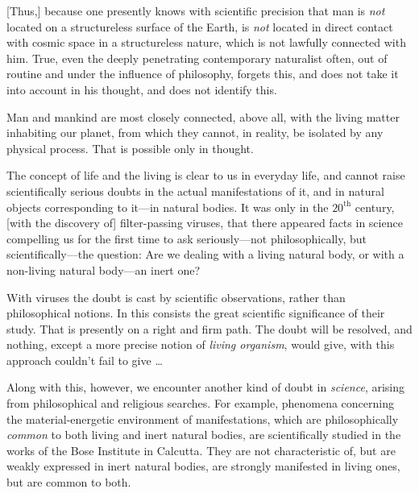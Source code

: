 [Thus,] because one
presently knows with scientific precision that man is \emph{not} located on a
structureless surface of the Earth, is \emph{not} located in direct contact
with cosmic space in a structureless nature, which is not lawfully connected
with him.  True, even the deeply penetrating contemporary naturalist often, out
of routine and under the influence of philosophy, forgets this, and does not
take it into account in his thought, and does not identify this.

Man and mankind are most closely connected, above all, with the living matter
inhabiting our planet, from which they cannot, in reality, be isolated by any
physical process.  That is possible only in thought.


\Section %
The concept of life and the living is clear to us in everyday life, and cannot
raise scientifically serious doubts in the actual manifestations of it, and in
natural objects corresponding to it---in natural bodies.  It was only in the
$20^{\mathrm{th}}$ century, [with the discovery of] filter-passing viruses,
that there appeared facts in science compelling us for the first time to ask
seriously---not philosophically, but scientifically---the question: Are we
dealing with a living natural body, or with a non-living natural body---an
inert one?

With viruses the doubt is cast by scientific observations, rather than
philosophical notions.  In this consists the great scientific significance of
their study.  That is presently on a right and firm path.  The doubt will be
resolved, and nothing, except a more precise notion of \emph{living organism},
would give, with this approach couldn't fail to give
\dots{}

Along with this, however, we encounter another kind of doubt in \emph{science},
arising from philosophical and religious searches.  For example, phenomena
concerning the material-energetic environment of manifestations, which are
philosophically \emph{common} to both living and inert natural bodies, are
scientifically studied in the works of the Bose Institute in
Calcutta. They are not characteristic of, but are weakly expressed in inert natural
bodies, are strongly manifested in living ones, but are common to both.

